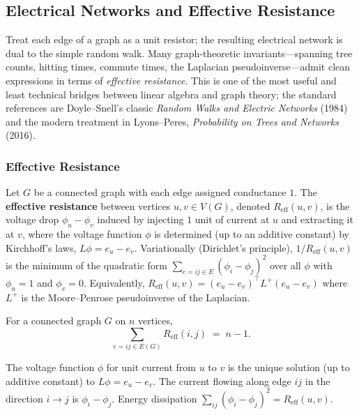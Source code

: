 \subsection{Electrical Networks and Effective Resistance}\label{subsec:electrical}

Treat each edge of a graph as a unit resistor; the resulting
electrical network is dual to the simple random walk. Many
graph-theoretic invariants---spanning tree counts, hitting times,
commute times, the Laplacian pseudoinverse---admit clean
expressions in terms of \emph{effective resistance}. This is one of
the most useful and least technical bridges between linear algebra
and graph theory; the standard references are Doyle--Snell's classic
\emph{Random Walks and Electric Networks} (1984) and the modern
treatment in Lyons--Peres, \emph{Probability on Trees and Networks}
(2016).

\subsubsection{Effective Resistance}

\begin{definition}\label{def:efftr}
Let $G$ be a connected graph with each edge assigned conductance $1$.
The \textbf{effective resistance} between vertices $u, v \in V(G)$,
denoted $R_{\mathrm{eff}}(u, v)$, is the voltage drop $\phi_u - \phi_v$
induced by injecting $1$ unit of current at $u$ and extracting it at
$v$, where the voltage function $\phi$ is determined (up to an additive
constant) by Kirchhoff's laws, $L\phi = e_u - e_v$. Variationally
(Dirichlet's principle), $1/R_{\mathrm{eff}}(u, v)$ is the minimum of
the quadratic form $\sum_{e = ij \in E} (\phi_i - \phi_j)^2$ over all
$\phi$ with $\phi_u = 1$ and $\phi_v = 0$.
Equivalently, $R_{\mathrm{eff}}(u, v) = (e_u - e_v)^\top L^+ (e_u - e_v)$
where $L^+$ is the Moore--Penrose pseudoinverse of the Laplacian.
\end{definition}

\begin{theorem}\label{thm:foster}
For a connected graph $G$ on $n$ vertices,
\[
  \sum_{e = ij \in E(G)} R_{\mathrm{eff}}(i, j) \;=\; n - 1.
\]
\end{theorem}

\begin{theorem}
The voltage function $\phi$ for unit current from $u$ to $v$ is the
unique solution (up to additive constant) to $L \phi = e_u - e_v$.
The current flowing along edge $ij$ in the direction $i \to j$ is
$\phi_i - \phi_j$. Energy dissipation
$\sum_{ij} (\phi_i - \phi_j)^2 = R_{\mathrm{eff}}(u, v)$.
\end{theorem}

